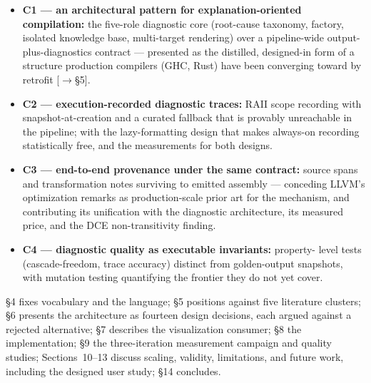 \begin{itemize}
\item \textbf{C1 --- an architectural pattern for explanation-oriented compilation:} the five-role diagnostic core (root-cause taxonomy, factory, isolated knowledge base, multi-target rendering) over a pipeline-wide output-plus-diagnostics contract --- presented as the distilled, designed-in form of a structure production compilers (GHC, Rust) have been converging toward by retrofit \cite{rust-rfc1644,ghc-structured-errors} [$\rightarrow$\S5].
\item \textbf{C2 --- execution-recorded diagnostic traces:} RAII scope recording with snapshot-at-creation and a curated fallback that is provably unreachable in the pipeline; with the lazy-formatting design that makes always-on recording statistically free, and the measurements for both designs.
\item \textbf{C3 --- end-to-end provenance under the same contract:} source spans and transformation notes surviving to emitted assembly --- conceding LLVM's optimization remarks \cite{llvm-remarks} as production-scale prior art for the mechanism, and contributing its unification with the diagnostic architecture, its measured price, and the DCE non-transitivity finding.
\item \textbf{C4 --- diagnostic quality as executable invariants:} property- level tests (cascade-freedom, trace accuracy) distinct from golden-output snapshots, with mutation testing quantifying the frontier they do not yet cover.
\end{itemize}

\S4 fixes vocabulary and the language; \S5 positions against five
literature clusters; \S6 presents the architecture as fourteen
design decisions, each argued against a rejected alternative; \S7
describes the visualization consumer; \S8 the implementation; \S9 the
three-iteration measurement campaign and quality studies; Sections~10--13
discuss scaling, validity, limitations, and future work, including
the designed user study; \S14 concludes.



